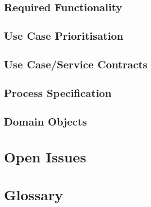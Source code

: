 \documentclass[a4paper]{article}
\begin{document}
		\subsection{Required Functionality}

		\subsection{Use Case Prioritisation}

		\subsection{Use Case/Service Contracts}

		\subsection{Process Specification}

		\subsection{Domain Objects}

	\section{Open Issues}

	\section{Glossary}
\end{document}
